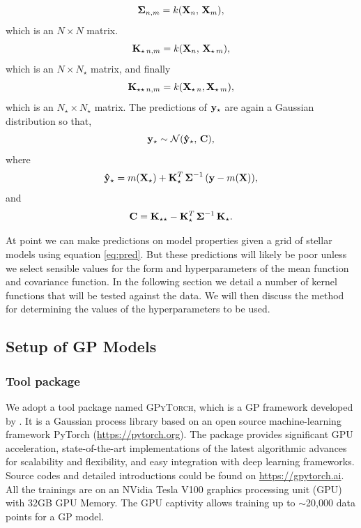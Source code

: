 \begin{equation}
{\bf \Sigma}_{n, m} = k({\bf X}_{n}, \, {\bf X}_{m}),
\end{equation}
which is an $N \times N$ matrix.
\begin{equation}
{\bf K}_{\star \, n, m} = k({\bf X}_{n}, \, { \bf X}_{\star \, m}),
\end{equation}
which is an $N \times N_{\star}$ matrix, and finally
\begin{equation}
{\bf K}_{\star \star \, n, m} = k({\bf X}_{\star \, n},  {\bf X}_{\star \,m}),
\end{equation}
which is an $N_{\star} \times N_{\star}$ matrix.
The predictions of $\bf y_{\star}$ are again a Gaussian distribution so that,
\begin{equation}
{\bf y}_{\star} \sim \mathcal{N}(\bf \hat{y}_{\star}, \, \bf C),
\label{eq:pred}
\end{equation}
where 
\begin{equation}
{\bf \hat{y}}_{\star} = m({\bf X}_{\star}) + {\bf K}_{\star}^{T} \, {\bf \Sigma}^{-1} \, ({\bf y} - m(\bf X)),
\end{equation}
and 
\begin{equation}
{\bf C} = {\bf K}_{\star \star} - {\bf K}_{\star}^{T} \, {\bf \Sigma}^{-1} \, {\bf K_{\star}}.
\end{equation}

At point we can make predictions on model properties given a grid of stellar models using equation \ref{eq:pred}.  But these predictions will likely be poor unless we select sensible values for the form and hyperparameters of the mean function and covariance function.  In the following section we detail a number of kernel functions that will be tested against the data.  We will then discuss the method for determining the values of the hyperparameters to be used.


\subsection{Setup of GP Models}\label{sec:setup}

\subsubsection{Tool package}

We adopt a tool package named \textsc{GPyTorch}, which is a GP framework developed by \citet{gardner2018gpytorch}. It is a Gaussian process library based on an open source machine-learning framework PyTorch (\url{https://pytorch.org}). The package provides significant GPU acceleration, state-of-the-art implementations of the latest algorithmic advances for scalability and flexibility, and easy integration with deep learning frameworks. Source codes and detailed introductions could be found on \url{https://gpytorch.ai}. 
%
All the trainings are on an NVidia Tesla V100 graphics processing unit (GPU) with 32GB GPU Memory. The GPU captivity allows training up to $\sim$20,000 data points for a GP model. 


